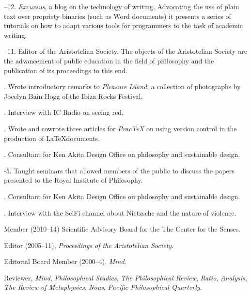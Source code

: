 \documentclass[11pt]{article}
\begin{document}
--12. \emph{Excursus}, a blog on the technology of writing. Advocating the use of plain text over propriety binaries (such as Word documents) it presents a series of tutorials on how to adapt various tools for programmers to the task of academic writing.

--11. Editor of the Aristotelian Society. The objects of the Aristotelian Society are the advancement of public education in the field of philosophy and the publication of its proceedings to this end. 

. Wrote introductory remarks to \emph{Pleasure Island}, a collection of photographs by Jocelyn Bain Hogg of the Ibiza Rocks Festival.

. Interview with IC Radio on seeing red.

. Wrote and cowrote three articles for \emph{PracTeX} on using version control in the production of \LaTeX documents.

. Consultant for Ken Akita Design Office on philosophy and sustainable design.

-5. Taught seminars that allowed members of the public to discuss the papers presented to the Royal Institute of Philosophy.

. Consultant for Ken Akita Design Office on philosophy and sustainable design.

. Interview with the SciFi channel about Nietzsche and the nature of violence.

\bigskip

\medskip


\ind Member (2010--14) Scientific Advisory Board for the The Center for the Senses.

\ind Editor (2005--11), \emph{Proceedings of the Aristotelian Society}.

\ind Editorial Board Member (2000--4), \emph{Mind}. 

\ind Reviewer, \emph{Mind}, \emph{Philosophical Studies},
\emph{The Philosophical Review}, \emph{Ratio}, \emph{Analysis}, \emph{The Review of Metaphysics}, \emph{Nous}, \emph{Pacific Philosophical Quarterly}.
\end{document}
